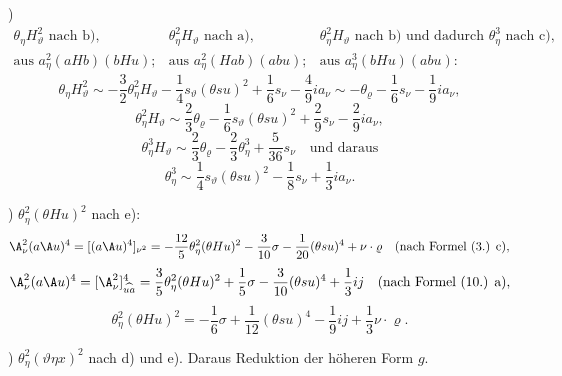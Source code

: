 )
\[
\begin{array}{ccc}
\theta_\eta H_\vartheta^2\text{ nach b)},&
\theta_\eta^2H_\vartheta\text{ nach a)},&
\theta_\eta^2H_\vartheta\text{ nach b) und dadurch }\theta_\eta^3\text{ nach c)},\\
\text{aus }a_\eta^2(aHb)(bHu);&
\text{aus }a_\eta^2(Hab)(abu);&
\text{aus }a_\eta^3(bHu)(abu):
\end{array}
\]
\[
\theta_\eta H_\vartheta^2\sim-\frac32\theta_\eta^2H_\vartheta-\frac14s_\vartheta(\theta su)^2+\frac16s_\nu-\frac49ia_\nu
\sim-\theta_\varrho-\frac16s_\nu-\frac19ia_\nu,
\]
\[
\theta_\eta^2H_\vartheta\sim\frac23\theta_\varrho-\frac16s_\vartheta(\theta su)^2+\frac29s_\nu-\frac29ia_\nu,
\]
\[
\theta_\eta^3H_\vartheta\sim\frac23\theta_\varrho-\frac23\theta_\eta^3+\frac5{36}s_\nu\quad\text{und daraus}
\]
\[
\theta_\eta^3\sim\frac14s_\vartheta(\theta su)^2-\frac18s_\nu+\frac13ia_\nu.
\]

) $\theta_\eta^2(\theta Hu)^2$ nach e):
\[
\A_\nu^2(a\A u)^4=[(a\A u)^4]_{\nu^2}=-\frac{12}{5}\theta_\eta^2(\theta Hu)^2-\frac3{10}\sigma-\frac1{20}(\theta su)^4+\nu\cdot\varrho
\quad(\text{nach Formel (3.) c}),
\]
\[
\A_\nu^2(a\A u)^4=[\A_\nu^2]^4_{\widehat{u a}}=\frac35\theta_\eta^2(\theta Hu)^2+\frac15\sigma-\frac3{10}(\theta su)^4+\frac13ij
\quad(\text{nach Formel (10.) a}),
\]
\[
\theta_\eta^2(\theta Hu)^2=-\frac16\sigma+\frac1{12}(\theta su)^4-\frac19ij+\frac13\nu\cdot\varrho.
\]

) $\theta_\eta^2(\vartheta\eta x)^2$ nach d) und e). Daraus Reduktion der höheren Form $g$.

